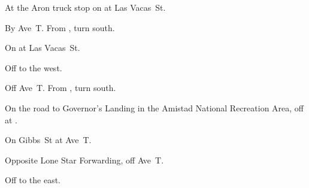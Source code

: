
\begin{LocationList}

At the Aron truck stop on  at Las Vacas~St.

By Ave~T. From , turn south.

\Location{\GarageHQ \Garage}
On  at Las Vacas~St.

Off   to the west.

Off Ave~T. From , turn south.

On the road to Governor's Landing
in the Amistad National Recreation Area,  %
off  at .

On  Gibbs~St at Ave~T.

\Location{\TruckService \Service}
Opposite Lone Star Forwarding, off Ave~T.

Off   to the east.

\end{LocationList}

